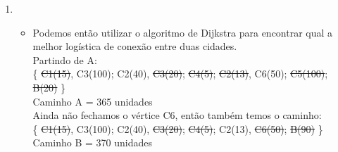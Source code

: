 \documentclass[11pt,reqno]{amsart}
\begin{document}
\begin{enumerate}
		\item

		\begin{itemize}
			\item Podemos então utilizar o algoritmo de Dijkstra para encontrar qual a melhor logística de conexão entre duas cidades. \\ Partindo de A: \\ \{ \st{C1(15)}, C3(100); C2(40), \st {C3(20)}; \st{C4(5)}; \st{C2(13)}, C6(50); \st{C5(100)}; \st{B(20)} \} \\ Caminho A = 365 unidades \\ Ainda não fechamos o vértice C6, então também temos o caminho: \\ \{ \st{C1(15)}, C3(100); C2(40), \st{C3(20)}; \st{C4(5)}; C2(13), \st{C6(50)}; \st{B(90)} \} \\ Caminho B = 370 unidades
		\end{itemize}
	\end{enumerate}
\end{document}
